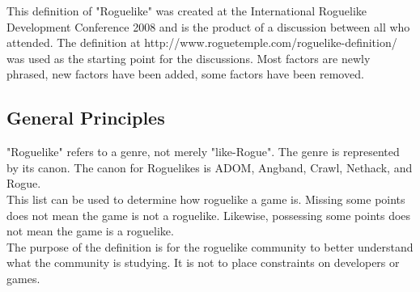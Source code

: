 \documentclass{article}
\begin{document}
This definition of "Roguelike" was created at the International 
Roguelike Development Conference 2008 and is the product of a 
discussion between all who attended. The definition at 
http://www.roguetemple.com/roguelike-definition/ was used as the 
starting point for the discussions. Most factors are newly phrased, 
new factors have been added, some factors have been removed.

\subsection*{General Principles}
 
"Roguelike" refers to a genre, not merely "like-Rogue". The genre is 
represented by its canon. The canon for Roguelikes is ADOM, Angband, 
Crawl, Nethack, and Rogue.\\
 
This list can be used to determine how roguelike a game is. Missing 
some points does not mean the game is not a roguelike. Likewise, 
possessing some points does not mean the game is a roguelike.\\  
 
The purpose of the definition is for the roguelike community to better 
understand what the community is studying. It is not to place 
constraints on developers or games.\\
\end{document}
